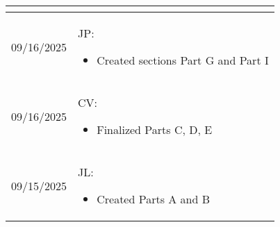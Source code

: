 \begin{longtable}{|l||p{13.5cm}|}
\begin{itemize}[topsep=0pt,itemsep=0pt,parsep=0pt,partopsep=0pt,leftmargin=12pt]
\end{itemize} 
\\ \hline

09/16/2025 & JP:
\begin{itemize}[topsep=0pt,itemsep=0pt,parsep=0pt,partopsep=0pt,leftmargin=12pt]
\item Created sections Part G and Part I

\end{itemize} 
\\ \hline

09/16/2025 & CV:
\begin{itemize}[topsep=0pt,itemsep=0pt,parsep=0pt,partopsep=0pt,leftmargin=12pt]
\item  Finalized Parts C, D, E
\end{itemize} 
\\ \hline

09/15/2025 & JL:
\begin{itemize}[topsep=0pt,itemsep=0pt,parsep=0pt,partopsep=0pt,leftmargin=12pt]
\item  Created Parts A and B
\end{itemize} 
\\ \hline

\end{longtable}


